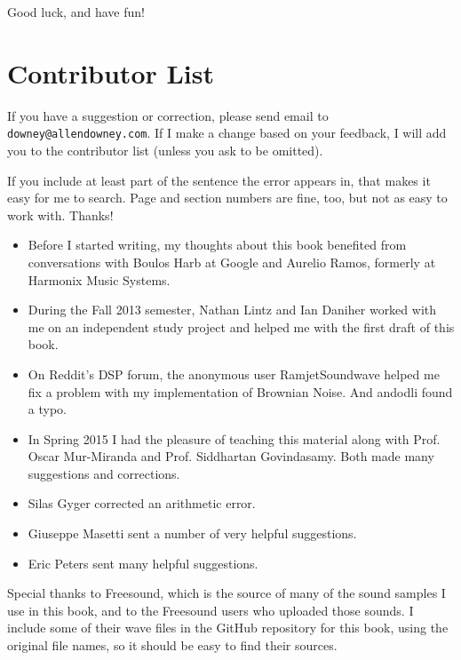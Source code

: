 \documentclass[12pt]{book}
\begin{document}
Good luck, and have fun!



\section*{Contributor List}

If you have a suggestion or correction, please send email to
{\tt downey@allendowney.com}.  If I make a change based on your
feedback, I will add you to the contributor list
(unless you ask to be omitted).

If you include at least part of the sentence the
error appears in, that makes it easy for me to search.  Page and
section numbers are fine, too, but not as easy to work with.
Thanks!

\small

\begin{itemize}

\item Before I started writing, my thoughts about this book
benefited from conversations with Boulos Harb at Google and
Aurelio Ramos, formerly at Harmonix Music Systems.

\item During the Fall 2013 semester, Nathan Lintz and Ian Daniher
worked with me on an independent study project and helped me with
the first draft of this book.

\item On Reddit's DSP forum, the anonymous user RamjetSoundwave
helped me fix a problem with my implementation of Brownian Noise.
And andodli found a typo.

\item In Spring 2015 I had the pleasure of teaching this material
along with Prof. Oscar Mur-Miranda and Prof. Siddhartan Govindasamy.
Both made many suggestions and corrections.

\item Silas Gyger corrected an arithmetic error.

\item Giuseppe Masetti sent a number of very helpful suggestions.

\item Eric Peters sent many helpful suggestions.


\end{itemize}


Special thanks to Freesound, which is the source of many of the
sound samples I use in this book, and to the Freesound users who
uploaded those sounds.  I include some of their wave files in
the GitHub repository for this book, using the original file
names, so it should be easy to find their sources.
\end{document}

